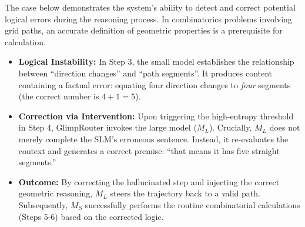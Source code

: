 \documentclass[11pt]{article}
\newcommand{\approach}{{GlimpRouter}\xspace}
\begin{document}
The case below demonstrates the system's ability to detect and correct potential logical errors during the reasoning process. 
In combinatorics problems involving grid paths, an accurate definition of geometric properties is a prerequisite for calculation.
\begin{itemize}
    \item \textbf{Logical Instability:} In Step 3, the small model establishes the relationship between ``direction changes'' and ``path segments''. It produces content containing a factual error: equating four direction changes to \textit{four} segments (the correct number is $4+1=5$).
    \item \textbf{Correction via Intervention:} Upon triggering the high-entropy threshold in Step 4, \approach invokes the large model ($M_L$). Crucially, $M_L$ does not merely complete the SLM's erroneous sentence. Instead, it re-evaluates the context and generates a correct premise: ``that means it has five straight segments.'' 
    \item \textbf{Outcome:} By correcting the hallucinated step and injecting the correct geometric reasoning, $M_L$ steers the trajectory back to a valid path. Subsequently, $M_S$ successfully performs the routine combinatorial calculations (Steps 5-6) based on the corrected logic.
\end{itemize}

\end{document}
